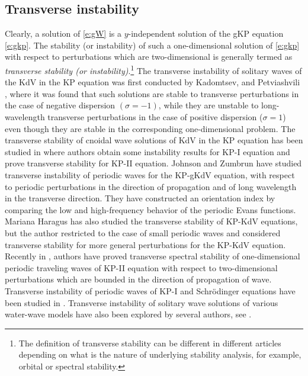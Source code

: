 \documentclass[12pt]{amsart}    %
\numberwithin{equation}{section}
\begin{document}
\subsection*{Transverse instability} Clearly, a solution of \eqref{e:gW} is a $y$-independent solution of the gKP equation \eqref{e:gkp}. The stability (or instability) of such a one-dimensional solution of \eqref{e:gkp} with respect to perturbations which are two-dimensional is generally termed as {\em transverse stability (or instability)}.\footnote{The definition of transverse stability can be different in different articles depending on what is the nature of underlying stability analysis, for example, orbital or spectral stability.} The transverse instability of solitary waves of the KdV in the KP equation was first conducted by Kadomtsev, and Petviashvili \cite{Kadomtsev1970OnMedia}, where it was found that such solutions are stable to transverse perturbations in the case of negative dispersion $(\sigma = -1)$, while they are unstable to long-wavelength transverse perturbations in the case of positive dispersion ($\sigma=1$) even though they are stable in the corresponding one-dimensional problem. The transverse stability of cnoidal wave solutions of KdV in the KP equation has been studied in \cite{MD88} where authors obtain some instability results for KP-I equation and prove transverse stability for KP-II equation.
Johnson and Zumbrun \cite{Johnson2010TransverseEquation} have studied transverse instability of periodic waves for the KP-gKdV equation, with respect to periodic perturbations in the direction of propagation and of long wavelength in the transverse direction. They have constructed an orientation index by comparing the low and high-frequency behavior of the periodic Evans functions. Mariana Haragus \cite{Haragus2011TransverseEquation} has also studied the transverse stability of KP-KdV equations, but the author restricted to the case of small periodic waves and considered transverse stability for more general perturbations for the KP-KdV equation. Recently 
in \cite{HLP17}, authors have proved transverse spectral stability of one-dimensional periodic traveling waves of KP-II equation with respect to two-dimensional perturbations which are bounded in the direction of propagation of wave.
Transverse instability of periodic waves of KP-I and Schr\"{o}dinger equations have been studied in \cite{HSS}. Transverse instability of solitary wave solutions of various water-wave models have also been explored by several authors, see \cite{GHS,PS,RT,RT1}.
\end{document}

